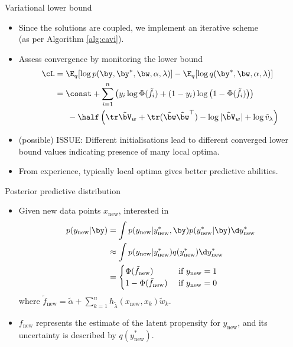 \begin{frame}{Variational lower bound}
  \begin{itemize}\setlength\itemsep{1em}
    \item Since the solutions are coupled, we implement an iterative scheme \\ (as per Algorithm \ref{alg:cavi}).
    \item Assess convergence by monitoring the lower bound
    \begin{align*}
      \cL 
      &= \E_q[\log p(\by,\by^*,\bw,\alpha,\lambda)] - \E_q[\log q(\by^*,\bw,\alpha,\lambda)] \\
      &= \const + \sum_{i=1}^n \left(y_i \log \Phi(\tilde f_i) + (1-y_i) \log \big(1 - \Phi(\tilde f_i)\big)\right) \\
      &\phantom{==}-\half \left( \tr\tilde\bV_w + \tr (\tilde\bw\tilde\bw^\top) - \log \vert \tilde\bV_w \vert + \log \tilde v_\lambda \right) 
    \end{align*}
    \item (possible) ISSUE: Different initialisations lead to different converged lower bound values indicating presence of many local optima.
    \item From experience, typically local optima gives better predictive abilities.
  \end{itemize}
\end{frame}

\begin{frame}{Posterior predictive distribution}
  \begin{itemize}\setlength\itemsep{1em}
    \item Given new data points $x_{\text{new}}$, interested in
    \begin{align*}
      p(y_{\text{new}}|\by) &= \int p(y_{\text{new}} | y^*_{\text{new}}, \by) p (y^*_{\text{new}} | \by) \d y^*_{\text{new}} \\
      &\approx \int p(y_{\text{new}} | y^*_{\text{new}}) q (y^*_{\text{new}}) \d y^*_{\text{new}} \\
      &= \begin{cases}
        \Phi(\tilde f_{\text{new}}) & \text{ if } y_{\text{new}} = 1 \\
        1 - \Phi(\tilde f_{\text{new}}) & \text{ if } y_{\text{new}} = 0 \\
      \end{cases}
    \end{align*}
    where $\tilde f_{\text{new}} = \tilde\alpha + {\sum_{k=1}^n} h_{\tilde\lambda}(x_{\text{new}}, x_k)\tilde w_k$.
    \item $f_{\text{new}}$ represents the estimate of the latent propensity for $y_{\text{new}}$, and its uncertainty is described by $q(y_{\text{new}}^*)$.
  \end{itemize}
\end{frame}
